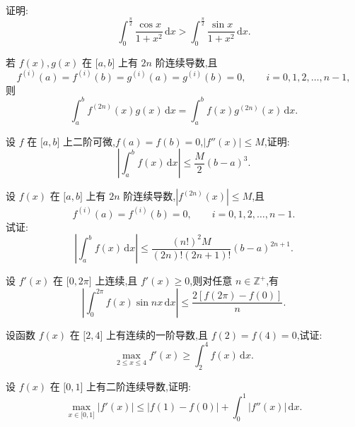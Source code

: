 \documentclass[../数学分析培优讲义.tex]{subfiles}
\begin{document}
\begin{example}
证明:
\[
    \int_0^{\frac{\pi}{2}}\dfrac{\cos x}{1+x^2}\,\mathrm{d}x
    >\int_0^{\frac{\pi}{2}}\dfrac{\sin x}{1+x^2}\,\mathrm{d}x.
\]
\end{example}
\exampleblank


\newpage


\begin{proposition}[\markstar]
若 $f(x),g(x)$ 在 $\lbrack a,b\rbrack$ 上有 $2n$ 阶连续导数,且
\[
    f^{(i)}(a)=f^{(i)}(b)=g^{(i)}(a)=g^{(i)}(b)=0,
    \qquad i=0,1,2,\ldots,n-1,
\]
则
\[
    \int_a^bf^{(2n)}(x)g(x)\,\mathrm{d}x
    =\int_a^bf(x)g^{(2n)}(x)\,\mathrm{d}x.
\]
\end{proposition}

\begin{example}
设 $f$ 在 $\lbrack a,b\rbrack$ 上二阶可微,$f(a)=f(b)=0$,$|f''(x)|\leq M$,证明:
\[
    \left|\int_a^bf(x)\,\mathrm{d}x\right|
    \leq\dfrac{M}{2}(b-a)^3.
\]
\end{example}
\exampleblank

\begin{example}
设 $f(x)$ 在 $\lbrack a,b\rbrack$ 上有 $2n$ 阶连续导数,$|f^{(2n)}(x)|\leq M$,且
\[
    f^{(i)}(a)=f^{(i)}(b)=0,
    \qquad i=0,1,2,\ldots,n-1.
\]
试证:
\[
    \left|\int_a^bf(x)\,\mathrm{d}x\right|
    \leq\dfrac{(n!)^2M}{(2n)!(2n+1)!}(b-a)^{2n+1}.
\]
\end{example}
\exampleblank

\begin{example}
设 $f'(x)$ 在 $\lbrack 0,2\pi\rbrack$ 上连续,且 $f'(x)\geq0$,则对任意 $n\in\mathbb{Z}^+$,有
\[
    \left|\int_0^{2\pi}f(x)\sin nx\,\mathrm{d}x\right|
    \leq\dfrac{2[f(2\pi)-f(0)]}{n}.
\]
\end{example}
\exampleblank


\newpage


\begin{example}
设函数 $f(x)$ 在 $\lbrack 2,4\rbrack$ 上有连续的一阶导数,且 $f(2)=f(4)=0$,试证:
\[
    \max\limits_{2\leq x\leq4}f'(x)
    \geq\int_2^4f(x)\,\mathrm{d}x.
\]
\end{example}
\exampleblank

\begin{example}
设 $f(x)$ 在 $\lbrack 0,1\rbrack$ 上有二阶连续导数,证明:
\[
    \max\limits_{x\in\lbrack 0,1\rbrack}|f'(x)|
    \leq|f(1)-f(0)|+\int_0^1|f''(x)|\,\mathrm{d}x.
\]
\end{example}
\exampleblank
\end{document}
